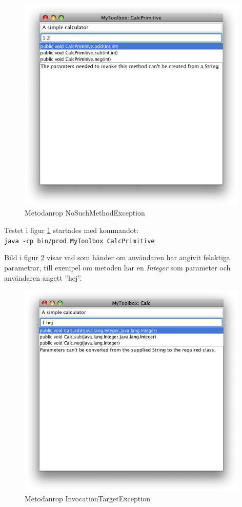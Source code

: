 \documentclass[a4paper, 12pt]{article}
\begin{document}
\begin{figure}[H]
  \begin{center}
    \includegraphics[width=110mm]{images/test2-out.png}
    \caption{Metodanrop NoSuchMethodException}
    \label{fig:test2-out}
  \end{center}
\end{figure}

Testet i figur \ref{fig:test2-out} startades med kommandot:\\
\verb!java -cp bin/prod MyToolbox CalcPrimitive!

\newpage
Bild i figur \ref{fig:test3-out} visar vad som händer om användaren har
angivit felaktiga parametrar, till exempel om metoden har en
\textit{Integer} som parameter och användaren angett ''hej''.

\begin{figure}[H]
  \begin{center}
    \includegraphics[width=110mm]{images/test3-out.png}
    \caption{Metodanrop InvocationTargetException}
    \label{fig:test3-out}
  \end{center}
\end{figure}
\end{document}
